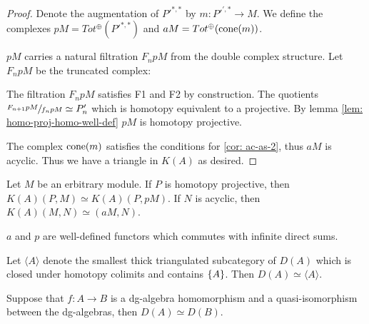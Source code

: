 \documentclass[../thesis.tex]{subfiles}
\begin{document}
\begin{proof}
                Denote the augmentation of $P'^{*,*}$ by $m : P'^{',*} \rightarrow M$. We define the complexes $pM = Tot^\oplus(P'^{*,*})$ and $aM = Tot^\oplus(\tt{cone}(m))$.
                
                $pM$ carries a natural filtration $F_npM$ from the double complex structure. Let $F_npM$ be the truncated complex:
                \begin{center}
                \end{center}
                
                The filtration $F_npM$ satisfies F1 and F2 by construction. The quotients $\sfrac{F_{n+1}pM}{f_npM} \simeq P'_n$ which is homotopy equivalent to a projective. By lemma \ref{lem: homo-proj-homo-well-def} $pM$ is homotopy projective.
                
                The complex $\tt{cone}(m)$ satisfies the conditions for \ref{cor: ac-as-2}, thus $aM$ is acyclic. Thus we have a triangle in $K(A)$ as desired.
            \end{proof}

            \begin{corollary}
                Let $M$ be an erbitrary module. If $P$ is homotopy projective, then $K(A)(P,M) \simeq K(A)(P, pM)$. If $N$ is acyclic, then $K(A)(M, N) \simeq (aM, N)$.

                $a$ and $p$ are well-defined functors which commutes with infinite direct sums. 
            \end{corollary}

            \begin{corollary}
                Let $\langle A \rangle$ denote the smallest thick triangulated subcategory of $D(A)$ which is closed under homotopy colimits and contains $\startset{A}$. Then $D(A) \simeq \langle A \rangle$.
            \end{corollary}

            \begin{corollary}\label{cor: ring-qiso-is-eq}
                Suppose that $f : A \rightarrow B$ is a dg-algebra homomorphism and a quasi-isomorphism between the dg-algebras, then $D(A) \simeq D(B)$.
            \end{corollary}
\end{document}
